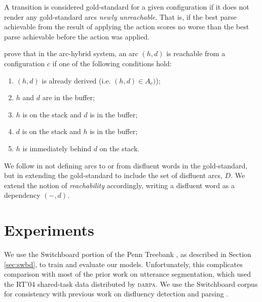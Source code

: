 \documentclass[11pt,letterpaper]{article}
\begin{document}
A transition is considered gold-standard for a given configuration if it does
not render any gold-standard arcs \emph{newly unreachable}.  That is, if the
best parse achievable from the result of applying the action scores no worse
than the best parse achievable before the action was applied. 


\citeauthor{goldberg:13} prove that in the arc-hybrid system, an arc
$(h, d)$ is reachable from a configuration $c$ if one of the following conditions
hold:

\begin{enumerate}
    \item $(h, d)$ is already derived (i.e. $(h, d) \in A_c)$);
    \item $h$ and $d$ are in the buffer;
    \item $h$ is on the stack and $d$ is in the buffer;
    \item $d$ is on the stack and $h$ is in the buffer;
    \item $h$ is immediately behind $d$ on the stack.
\end{enumerate}


We follow \citet{honnibal:14} in not defining arcs to or from disfluent words
in the gold-standard, but in extending the gold-standard to include the set of
disfluent arcs, $D$.  We extend the notion of \emph{reachability} accordingly,
writing a disfluent word as a dependency $(-, d)$.
\section{Experiments}

We use the Switchboard portion of the Penn Treebank \citep{marcus:93}, as
described in Section \ref{sec:swbd}, to train and evaluate our models.  Unfortunately,
this complicates comparison with most of the prior work on utterance segmentation,
which used the RT'04 shared-task data distributed by \textsc{darpa}.  We use
the Switchboard corpus for consistency with previous work on disfluency 
detection and parsing \citep{rasooli:13,rasooli:14,honnibal:14,qian:13}.
\end{document}

